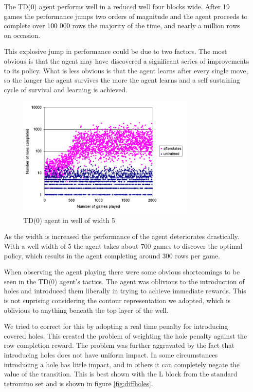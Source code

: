 \documentclass{rucsthesis}
\begin{document}
The TD(0) agent performs well in a reduced well four blocks wide. After 19 games the performance jumps two orders of magnitude and the agent proceeds to complete over 100 000 rows the majority of the time, and nearly a million rows on occasion.

This explosive jump in performance could be due to two factors. The most obvious is that the agent may have discovered a significant series of improvements to its policy. What is less obvious is that the agent learns after every single move, so the longer the agent survives the more the agent learns and a self sustaining cycle of survival and learning is achieved.

\begin{figure}[h]
\centering
\includegraphics[width=3.5in]{afterstatesredtet5well.png}
\caption{TD(0) agent in well of width 5}
\label{fig:afterstatesredtet5well}
\end{figure}

As the width is increased the performance of the agent deteriorates drastically. With a well width of 5 the agent takes about 700 games to discover the optimal policy, which results in the agent completing around 300 rows per game.

When observing the agent playing there were some obvious shortcomings to be seen in the TD(0) agent's tactics. The agent was oblivious to the introduction of holes and introduced them liberally in trying to achieve immediate rewards. This is not suprising considering the contour representation we adopted, which is oblivious to anything beneath the top layer of the well. 

We tried to correct for this by adopting a real time penalty for introducing covered holes. This created the problem of weighting the hole penalty against the row completion reward. The problem was further aggravated by the fact that introducing holes does not have uniform impact. In some circumstances introducing a hole has little impact, and in others it can completely negate the value of the transition. This is best shown with the L block from the standard tetromino set and is shown in figure \ref{fig:diffholes}. 
\end{document}
